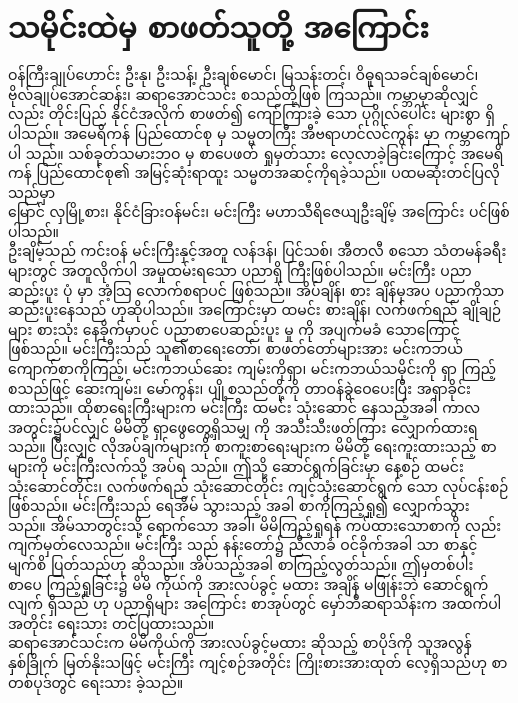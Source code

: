 \documentclass[conference]{IEEEtran}
\begin{document}
\section{\padauktext သမိုင်းထဲမှ စာဖတ်သူတို့ အကြောင်း}
{\padauktext
ဝန်ကြီးချုပ်ဟောင်း ဦးနု၊ ဦးသန့်၊ ဦးချစ်မောင်၊ မြသန်းတင့်၊ ဝိဓူရသခင်ချစ်မောင်၊ ဗိုလ်ချုပ်အောင်ဆန်း၊ ဆရာအောင်သင်း စသည်တို့ဖြစ် ကြသည်။ ကမ္ဘာမှာဆိုလျှင်လည်း တိုင်းပြည် နိုင်ငံအလိုက် စာဖတ်၍ ကျော်ကြားခဲ့ သော ပုဂ္ဂိုလ်ပေါင်း များစွာ ရှိပါသည်။ အမေရိကန် ပြည်ထောင်စု မှ သမ္မတကြီး အီဗရာဟင်လင်ကွန်း မှာ ကမ္ဘာကျော် ပါ သည်။ သစ်ခုတ်သမားဘဝ မှ စာပေဖတ် ရှုမှတ်သား လေ့လာခဲ့ခြင်းကြောင့် အမေရိကန် ပြည်ထောင်စု၏ အမြင့်ဆုံးရာထူး သမ္မတအဆင့်ကိုရခဲ့သည်။
ပထမဆုံးတင်ပြလိုသည်မှာ }\leavevmode\\
{\padauktext မြောင် လှမြို့စား၊ နိုင်ငံခြားဝန်မင်း၊ မင်းကြီး မဟာသီရိဇေယျဦးချိမ့် အကြောင်း ပင်ဖြစ်ပါသည်။}\leavevmode\\
{\padauktext ဦးချိမ့်သည် ကင်းဝန် မင်းကြီးနှင့်အတူ လန်ဒန်၊ ပြင်သစ်၊ အီတလီ စသော သံတမန်ခရီးများတွင် အတူလိုက်ပါ အမှုထမ်းရသော ပညာရှိ ကြီးဖြစ်ပါသည်။ မင်းကြီး ပညာဆည်းပူး ပုံ မှာ အံ့သြ လောက်စရာပင် ဖြစ်သည်။ အိပ်ချိန်၊ စား ချိန်မှအပ ပညာကိုသာဆည်းပူးနေသည် ဟုဆိုပါသည်။ အကြောင်းမှာ ထမင်း စားချိန်၊ လက်ဖက်ရည် ချိုချဉ်များ စားသုံး နေခိုက်မှာပင် ပညာစာပေဆည်းပူး မှု ကို အပျက်မခံ သောကြောင့် ဖြစ်သည်။ မင်းကြီးသည် သူ၏စာရေးတော်၊ စာဖတ်တော်များအား မင်းကဘယ် ကျောက်စာကိုကြည့်၊ မင်းကဘယ်ဆေး ကျမ်းကိုရှာ၊ မင်းကဘယ်သမိုင်းကို ရှာ ကြည့်စသည်ဖြင့် ဆေးကျမ်း၊ မော်ကွန်း၊ ပျို့စသည်တို့ကို တာဝန်ခွဲဝေပေးပြီး အရှာခိုင်းထားသည်။ ထိုစာရေးကြီးများက မင်းကြီး ထမင်း သုံးဆောင် နေသည့်အခါ ကာလ အတွင်း၌ပင်လျှင် မိမိတို့ ရှာဖွေတွေ့ရှိသမျှ ကို အသီးသီးဖတ်ကြား လျှောက်ထားရ သည်။ ပြီးလျှင် လိုအပ်ချက်များကို စာကူးစာရေးများက မိမိတို့ ရေးကူးထားသည့် စာများကို မင်းကြီးလက်သို့ အပ်ရ သည်။ ဤသို့ ဆောင်ရွက်ခြင်းမှာ နေ့စဉ် ထမင်း သုံးဆောင်တိုင်း၊ လက်ဖက်ရည် သုံးဆောင်တိုင်း ကျင့်သုံးဆောင်ရွက် သော လုပ်ငန်းစဉ် ဖြစ်သည်။ မင်းကြီးသည် ရေအိမ် သွားသည့် အခါ စာကိုကြည့်ရှု၍ လျှောက်သွား သည်။ အိမ်သာတွင်းသို့ ရောက်သော အခါ၊ မိမိကြည့်ရှုရန် ကပ်ထားသောစာကို လည်း ကျက်မှတ်လေသည်။ မင်းကြီး သည် နန်းတော်၌ ညီလာခံ ဝင်ခိုက်အခါ သာ စာနှင့်မျက်စိ ပြတ်သည်ဟု ဆိုသည်။ အိပ်သည့်အခါ စာကြည့်လွတ်သည်။ ဤမှတစ်ပါး စာပေ ကြည့်ရှုခြင်း၌ မိမိ ကိုယ်ကို အားလပ်ခွင့် မထား အချိန် မဖြုန်းဘဲ ဆောင်ရွက်လျက် ရှိသည် ဟု ပညာရှိများ အကြောင်း စာအုပ်တွင် မှော်ဘီဆရာသိန်းက အထက်ပါ အတိုင်း ရေးသား တင်ပြထားသည်။}\leavevmode\\ 
{\padauktext ဆရာအောင်သင်းက မိမိကိုယ်ကို အားလပ်ခွင့်မထား ဆိုသည့် စာပိုဒ်ကို သူအလွန်နှစ်ခြိုက် မြတ်နိုးသဖြင့် မင်းကြီး ကျင့်စဉ်အတိုင်း ကြိုးစားအားထုတ် လေ့ရှိသည်ဟု စာတစ်ပုဒ်တွင် ရေးသား ခဲ့သည်။}\leavevmode\\ 
\end{document}

